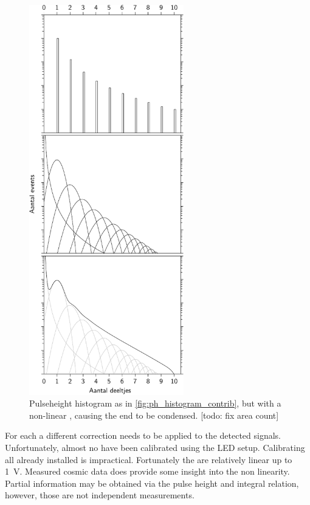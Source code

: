 \begin{figure}
    \centering
    \includegraphics[width=0.6\textwidth]
                    {plots/station/ph_histogram_contrib_nonlin}
    \caption{Pulseheight histogram as in \cref{fig:ph_histogram_contrib}, but with a non-linear \pmt, causing the end to be condensed. [todo: fix area count]}
    \label{fig:ph_histogram_contrib_nonlin}
\end{figure}

For each \senstech \pmt a different correction needs to be applied to the detected signals. Unfortunately, almost no \pmts have been calibrated using the LED setup. Calibrating all already installed \pmts is impractical. Fortunately the \pmts are relatively linear up to \SI{1}{\volt}. Measured cosmic data does provide some insight into the non linearity. Partial information may be obtained via the pulse height and integral relation, however, those are not independent measurements.

